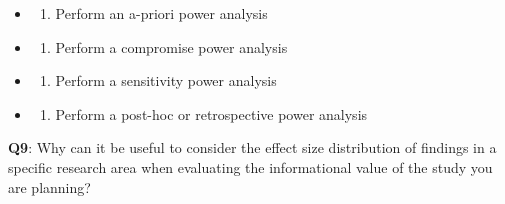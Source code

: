 \documentclass[
  letterpaper,
  DIV=11,
  numbers=noendperiod]{scrreprt}
\providecommand{\tightlist}{%
  \setlength{\itemsep}{0pt}\setlength{\parskip}{0pt}}\usepackage{longtable,booktabs,array}
\begin{document}
\begin{itemize}
\item
  \begin{enumerate}
  \def\labelenumi{(\Alph{enumi})}
  \tightlist
  \item
    Perform an a-priori power analysis\\
  \end{enumerate}
\item
  \begin{enumerate}
  \def\labelenumi{(\Alph{enumi})}
  \setcounter{enumi}{1}
  \tightlist
  \item
    Perform a compromise power analysis\\
  \end{enumerate}
\item
  \begin{enumerate}
  \def\labelenumi{(\Alph{enumi})}
  \setcounter{enumi}{2}
  \tightlist
  \item
    Perform a sensitivity power analysis\\
  \end{enumerate}
\item
  \begin{enumerate}
  \def\labelenumi{(\Alph{enumi})}
  \setcounter{enumi}{3}
  \tightlist
  \item
    Perform a post-hoc or retrospective power analysis\\
  \end{enumerate}
\end{itemize}

\textbf{Q9}: Why can it be useful to consider the effect size
distribution of findings in a specific research area when evaluating the
informational value of the study you are planning?
\end{document}
